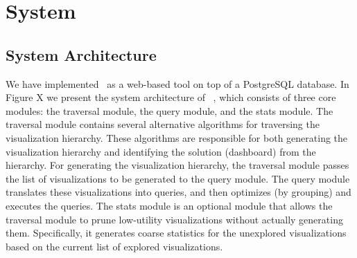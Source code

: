 \newpage
\section{System}
\subsection{System Architecture}

We have implemented \system\ as a web-based tool on top of a PostgreSQL database. In Figure X we present the system architecture of \system\ , which consists of three core modules: the traversal module, the query module, and the stats module. The traversal module contains several alternative algorithms for traversing the visualization hierarchy. These algorithms are responsible for both generating the visualization hierarchy and identifying the solution (dashboard) from the hierarchy. For generating the visualization hierarchy, the traversal module passes the list of visualizations to be generated to the query module. The query module translates these visualizations into queries, and then optimizes (by grouping) and executes the queries. The stats module is an optional module that allows the traversal module to prune low-utility visualizations without actually generating them. Specifically, it generates coarse statistics for the unexplored visualizations based on the current list of explored visualizations. 

\begin{center}
\end{center}

